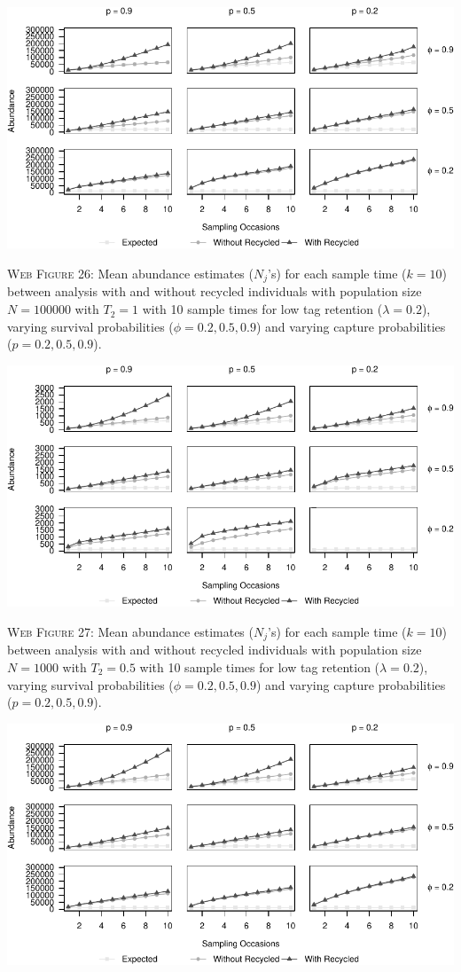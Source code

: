 \documentclass[]{article}
\begin{document}
\includegraphics{Appendix_BW_files/figure-latex/26_abundance_L_GJSTL2-1.pdf}

\textsc{Web Figure 26:} Mean abundance estimates (\(N_j\)'s) for each
sample time (\(k=10\)) between analysis with and without recycled
individuals with population size \(N=100000\) with \(T_2=1\) with 10
sample times for low tag retention (\(\lambda=0.2\)), varying survival
probabilities (\(\phi=0.2,0.5,0.9\)) and varying capture probabilities
(\(p=0.2,0.5,0.9\)).

\newpage

\includegraphics{Appendix_BW_files/figure-latex/27_abundance_L_GJSTL4-1.pdf}

\textsc{Web Figure 27:} Mean abundance estimates (\(N_j\)'s) for each
sample time (\(k=10\)) between analysis with and without recycled
individuals with population size \(N=1000\) with \(T_2=0.5\) with 10
sample times for low tag retention (\(\lambda=0.2\)), varying survival
probabilities (\(\phi=0.2,0.5,0.9\)) and varying capture probabilities
(\(p=0.2,0.5,0.9\)).

\includegraphics{Appendix_BW_files/figure-latex/28_abundance_L_GJSTL3-1.pdf}
\end{document}
